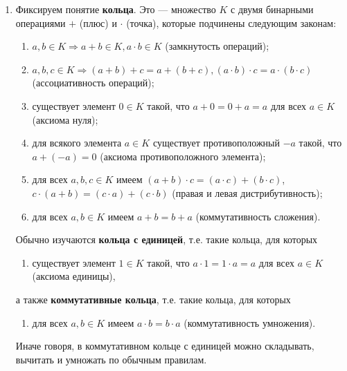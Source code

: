 \begin{enumerate}

\item Фиксируем понятие \textbf{кольца}. Это --- множество $K$ с двумя бинарными операциями $+$ (плюс) и $\cdot$ (точка), которые подчинены следующим законам:
\begin{enumerate}[{\bf Ring}1]
\item $a,b\in K\Rightarrow a+b\in K, a\cdot b\in K$ (замкнутость операций);
\item $a,b,c\in K\Rightarrow (a+b)+c=a+(b+c), (a\cdot b)\cdot c = a\cdot (b\cdot c)$ (ассоциативность операций);
\item существует элемент $0\in K$ такой, что $a+0=0+a=a$ для всех $a\in K$ (аксиома нуля);
\item для всякого элемента $a\in K$ существует противоположный $-a$ такой, что $a+(-a)=0$ (аксиома противоположного элемента);
\item для всех $a,b,c\in K$ имеем $(a+b)\cdot c=(a\cdot c)+(b\cdot c)$, $c\cdot(a+b)=(c\cdot a)+(c\cdot b)$ (правая и левая дистрибутивность);
\item для всех $a,b\in K$ имеем $a+b=b+a$ (коммутативность сложения).
\end{enumerate}

Обычно изучаются \textbf{кольца с единицей}, т.е. такие кольца, для которых
\begin{enumerate}[resume*]
\item существует элемент $1\in K$ такой, что $a\cdot 1=1\cdot a=a$ для всех $a\in K$ (аксиома единицы),
\end{enumerate}
а также \textbf{коммутативные кольца}, т.е. такие кольца, для которых
\begin{enumerate}[resume*]
\item для всех $a,b\in K$ имеем $a\cdot b=b\cdot a$ (коммутативность умножения).
\end{enumerate}

Иначе говоря, в коммутативном кольце с единицей можно складывать, вычитать и умножать по обычным правилам.
\end{enumerate}


